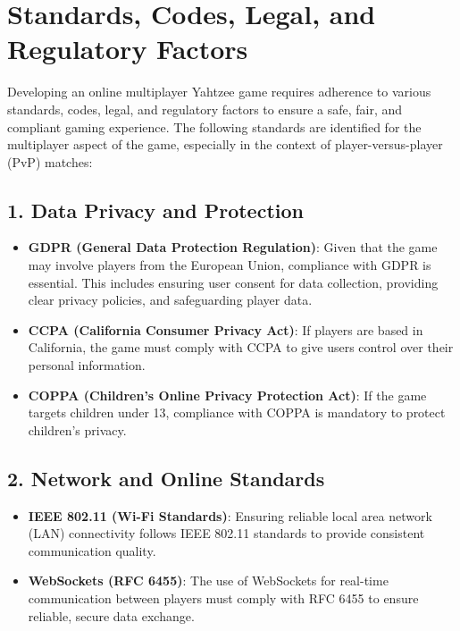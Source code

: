 \section{Standards, Codes, Legal, and Regulatory Factors}    

Developing an online multiplayer Yahtzee game requires adherence to various standards, codes, legal, and regulatory factors to ensure a safe, fair, and compliant gaming experience. The following standards are identified for the multiplayer aspect of the game, especially in the context of player-versus-player (PvP) matches:

\subsection*{1. Data Privacy and Protection}
\begin{itemize}
    \item \textbf{GDPR (General Data Protection Regulation)}: Given that the game may involve players from the European Union, compliance with GDPR is essential. This includes ensuring user consent for data collection, providing clear privacy policies, and safeguarding player data.
    \item \textbf{CCPA (California Consumer Privacy Act)}: If players are based in California, the game must comply with CCPA to give users control over their personal information.
    \item \textbf{COPPA (Children's Online Privacy Protection Act)}: If the game targets children under 13, compliance with COPPA is mandatory to protect children’s privacy.
\end{itemize}

\subsection*{2. Network and Online Standards}
\begin{itemize}
    \item \textbf{IEEE 802.11 (Wi-Fi Standards)}: Ensuring reliable local area network (LAN) connectivity follows IEEE 802.11 standards to provide consistent communication quality.
    \item \textbf{WebSockets (RFC 6455)}: The use of WebSockets for real-time communication between players must comply with RFC 6455 to ensure reliable, secure data exchange.
\end{itemize}

